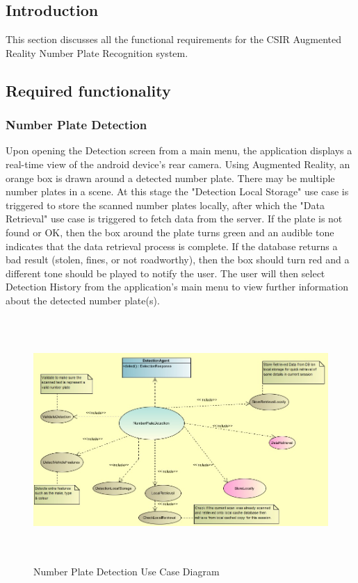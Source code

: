 \documentclass[12pt]{article}
\begin{document}
                    \subsection{Introduction}
                    This section discusses all the functional requirements for the CSIR Augmented Reality Number Plate Recognition system.
                    
                    \subsection{Required functionality}
                    		\subsubsection{Number Plate Detection}
                    				Upon opening the Detection screen from a main menu, the application displays a real-time view of the android device's rear camera. Using Augmented Reality, an orange box is drawn around a detected number plate. There may be multiple number plates in a scene. At this stage the "Detection Local Storage" use case is triggered to store the scanned number plates locally, after which the "Data Retrieval" use case is triggered to fetch data from the server. If the plate is not found or OK, then the box around the plate turns green and an audible tone indicates that the data retrieval process is complete. If the database returns a bad result (stolen, fines, or not roadworthy), then the box should turn red and a different tone should be played to notify the user.
                    				The user will then select Detection History from the application's main menu to view further information about the detected number plate(s).
                    				\begin{figure}[h]
					           				\centering
					           				\includegraphics[width=6.25in, height=3.67in]{Pictures/NumberPlateDetectionUseCase.jpg}
					           				\caption{Number Plate Detection Use Case Diagram}
		           					\end{figure}
                    				\FloatBarrier
                    				
\end{document}
